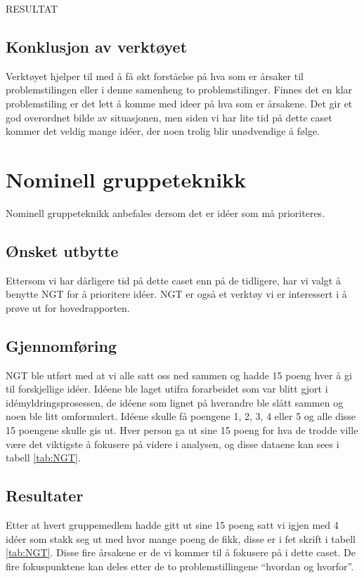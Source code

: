 RESULTAT

\subsection{Konklusjon av verktøyet}
Verktøyet hjelper til med å få økt forståelse på hva som er årsaker til problemstilingen eller i denne samenheng to problemstilinger. Finnes det en klar problemstiling er det lett å komme med ideer på hva som er årsakene. Det gir et god overordnet bilde av situasjonen, men siden vi har lite tid på dette caset kommer det veldig mange idéer, der noen trolig blir unødvendige å følge.

\section{Nominell gruppeteknikk}
Nominell gruppeteknikk anbefales dersom det er idéer som må prioriteres. 

\subsection{Ønsket utbytte}
Ettersom vi har dårligere tid på dette caset enn på de tidligere, har vi valgt å benytte NGT for å prioritere idéer. NGT er også et verktøy vi er interessert i å prøve ut for hovedrapporten. 

\subsection{Gjennomføring}
NGT ble utført med at vi alle satt oss ned sammen og hadde 15 poeng hver å gi til forskjellige idéer. Idéene ble laget utifra forarbeidet som var blitt gjort i idémyldringsprosessen, de idéene som lignet på hverandre ble slått sammen og noen ble litt omformulert. Idéene skulle få poengene 1, 2, 3, 4 eller 5 og alle disse 15 poengene skulle gis ut. Hver person ga ut sine 15 poeng for hva de trodde ville være det viktigste å fokusere på videre i analysen, og disse dataene kan sees i tabell \ref{tab:NGT}.

\subsection{Resultater}
Etter at hvert gruppemedlem hadde gitt ut sine 15 poeng satt vi igjen med 4 idéer som stakk seg ut med hvor mange poeng de fikk, disse er i fet skrift i tabell \ref{tab:NGT}. Disse fire årsakene er de vi kommer til å fokusere på i dette caset. De fire fokuspunktene kan deles etter de to problemstillingene ``hvordan og hvorfor''.

